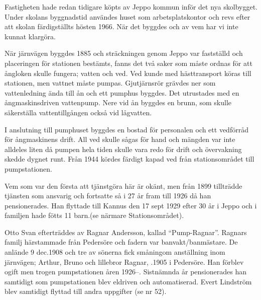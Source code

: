 Fastigheten hade redan tidigare köpts av Jeppo kommun inför det nya skolbygget. Under skolans byggnadstid användes huset som arbetsplatskontor och revs efter att skolan färdigställts hösten 1966. När det byggdes och av vem har vi inte kunnat klargöra.




När järnvägen byggdes 1885 och sträckningen genom Jeppo var fastställd och placeringen för stationen bestämts, fanns det två saker som måste ordnas för att ångloken skulle fungera; vatten och ved. Ved kunde med hästtransport köras till stationen, men vattnet måste pumpas. Gjutjärnsrör grävdes ner som vattenledning ända till ån och ett pumphus byggdes. Det utrustades med en ångmaskinsdriven vattenpump. Nere vid ån byggdes en brunn, som skulle säkerställa vattentillgången också vid lågvatten.


I anslutning till pumphuset byggdes en bostad för personalen och ett vedförråd för ångmaskinens drift. All ved skulle sågas för hand och mängden var inte alldeles liten då pumpen hela tiden skulle vara redo för drift och övervakning skedde dygnet runt. Från 1944 kördes färdigt kapad ved från stationsområdet till pumpstationen.

Vem som var den första att tjänstgöra här är okänt, men från 1899 tillträdde  tjänsten som ansvarig och fortsatte så i 27 år fram till 1926 då han pensionerades. Han flyttade till Kannus den 17 sept 1929 efter 30 år i Jeppo och i familjen hade fötts 11 barn.(se närmare Stationsområdet).


Otto Svan efterträddes av Ragnar Andersson, kallad ``Pump-Ragnar''. Ragnars familj härstammade från Pedersöre och fadern var banvakt/banmästare. De anlände 9 dec.1908 och tre av sönerna fick småningom anställning inom järnvägen; Arthur, Bruno och lillebror Ragnar, .1905 i Pedersöre. Han förblev ogift men trogen pumpstationen åren 1926--. Sistnämnda år pensionerades han samtidigt som pumpstationen blev eldriven och automatiserad. Evert Lindström blev samtidigt flyttad till andra uppgifter (se nr 52).

